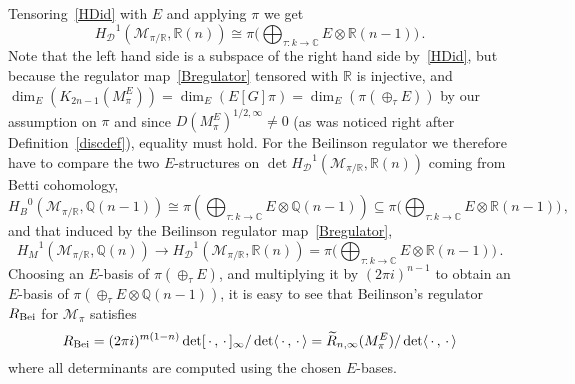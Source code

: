 \documentclass{amsart}
\begin{document}
\begin{remark}
Tensoring~\eqref{HDid} with $ E $ and applying $\pi$ we get
\begin{equation*}
    {H_{\mathcal D}}^1({\mathcal{M}_{\pi/{\mathbb R}}},{\mathbb R}(n)) {\cong}  \pi \bigl( \bigoplus_{\tau: k\to {\mathbb C}} E\otimes {\mathbb R}(n-1) \bigr)
\,.
\end{equation*}
Note that the left hand side is a subspace of the right hand side by~\eqref{HDid}, but because
the regulator map~\eqref{Bregulator} tensored with $ {\mathbb R} $ is injective,
and $ \dim_E(K_{2n-1}(M_\pi^E)) = \dim_E(E[G]\pi) = \dim_E(\pi(\oplus_{\tau} E)) $ by our assumption on $ \pi $
and since $  D(M_\pi^E)^{1/2,\infty} \ne 0 $ (as was noticed right after Definition~\ref{discdef}),
equality must hold.
For the Beilinson regulator we therefore have to compare
the two $ E $-structures on $ \det{H_{\mathcal D}}^1({\mathcal{M}_{\pi/{\mathbb R}}},{\mathbb R}(n)) $ coming from
Betti cohomology,
\begin{equation*}
{H_B}^0({\mathcal{M}_{\pi/{\mathbb R}}},{\mathbb Q}(n-1)) {\cong}  \pi (\bigoplus_{\tau: k\to {\mathbb C}} E\otimes {\mathbb Q}(n-1)) 
\subseteq     \pi \bigl(\bigoplus_{\tau: k\to {\mathbb C}} E\otimes {\mathbb R}(n-1) \bigr) 
\,,
\end{equation*}
and that induced by the Beilinson regulator map~\eqref{Bregulator},
\begin{equation*}
{H_M}^1({\mathcal{M}_{\pi/{\mathbb R}}},{\mathbb Q}(n)) \to {H_{\mathcal D}}^1({\mathcal{M}_{\pi/{\mathbb R}}},{\mathbb R}(n)) 
= \pi \bigl(\bigoplus_{\tau: k\to {\mathbb C}} E\otimes {\mathbb R}(n-1)\bigr) 
\,.
\end{equation*}
Choosing an $ E $-basis of $ \pi(\oplus_{\tau} E) $, and multiplying it by $ (2\pi i)^{n-1} $ to obtain an $ E $-basis
of $ \pi (\oplus_{\tau} E{\otimes} {\mathbb Q}(n-1)) $, it is easy to see that
Beilinson's regulator $ R_{\textup{Bei}} $ for $ {\mathcal{M}_\pi} $ satisfies
\begin{equation*}
R_{\textup{Bei}} = (2\pi i)^{m(1-n)} \det [\,\cdot\,,\,\cdot\,]_\infty / \det \langle\,\cdot\,,\,\cdot\,\rangle 
= \widetilde  R_{n,\infty}(M_\pi^E) / \det \langle\,\cdot\,,\,\cdot\,\rangle 
\end{equation*}
where all determinants are computed using the chosen $ E $-bases.


\end{remark}
\end{document}
